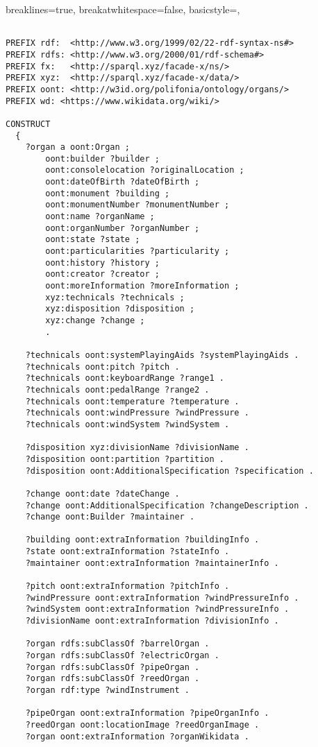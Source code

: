 \lstset
{
    breaklines=true,
    breakatwhitespace=false,
    basicstyle=\linespread{1}\ttfamily,
}
\begin{lstlisting}[caption={organ-details.sparql}]

PREFIX rdf:  <http://www.w3.org/1999/02/22-rdf-syntax-ns#>
PREFIX rdfs: <http://www.w3.org/2000/01/rdf-schema#>
PREFIX fx:   <http://sparql.xyz/facade-x/ns/>
PREFIX xyz:  <http://sparql.xyz/facade-x/data/>
PREFIX oont: <http://w3id.org/polifonia/ontology/organs/>
PREFIX wd: <https://www.wikidata.org/wiki/> 

CONSTRUCT
  {
	?organ a oont:Organ ;
		oont:builder ?builder ;
		oont:consolelocation ?originalLocation ;
		oont:dateOfBirth ?dateOfBirth ;
		oont:monument ?building ;
		oont:monumentNumber ?monumentNumber ;
		oont:name ?organName ;
		oont:organNumber ?organNumber ;
		oont:state ?state ;
		oont:particularities ?particularity ;
		oont:history ?history ;
		oont:creator ?creator ;
		oont:moreInformation ?moreInformation ;
		xyz:technicals ?technicals ; 
		xyz:disposition ?disposition ;
		xyz:change ?change ;
		.

	?technicals oont:systemPlayingAids ?systemPlayingAids .
	?technicals oont:pitch ?pitch .
	?technicals oont:keyboardRange ?range1 . 
	?technicals oont:pedalRange ?range2 . 
	?technicals oont:temperature ?temperature .
	?technicals oont:windPressure ?windPressure .
	?technicals oont:windSystem ?windSystem .
	
	?disposition xyz:divisionName ?divisionName . 
	?disposition oont:partition ?partition .
	?disposition oont:AdditionalSpecification ?specification .

	?change oont:date ?dateChange .
	?change oont:AdditionalSpecification ?changeDescription . 
	?change oont:Builder ?maintainer .

	?building oont:extraInformation ?buildingInfo .
	?state oont:extraInformation ?stateInfo .
	?maintainer oont:extraInformation ?maintainerInfo .

	?pitch oont:extraInformation ?pitchInfo .
	?windPressure oont:extraInformation ?windPressureInfo .
	?windSystem oont:extraInformation ?windPressureInfo .
	?divisionName oont:extraInformation ?divisionInfo .

	?organ rdfs:subClassOf ?barrelOrgan .
	?organ rdfs:subClassOf ?electricOrgan .
	?organ rdfs:subClassOf ?pipeOrgan .
	?organ rdfs:subClassOf ?reedOrgan .
	?organ rdf:type ?windInstrument . 

	?pipeOrgan oont:extraInformation ?pipeOrganInfo .
	?reedOrgan oont:locationImage ?reedOrganImage .
	?organ oont:extraInformation ?organWikidata .


\end{lstlisting}
